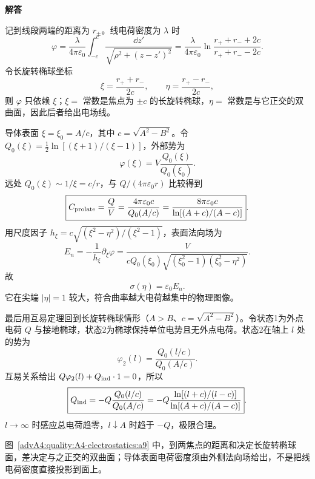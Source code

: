 \begin{advsolution}
\begin{center}\begin{minipage}{.96\linewidth}\centering
\raggedright{\bfseries\color{DeepBlue}解答}\par\smallskip\centering

\label{advA4:quality:A4-electrostatics:a9}
\end{minipage}\end{center}

记到线段两端的距离为 $r_\pm$。线电荷密度为 $\lambda$ 时
\[
 \varphi=\frac\lambda{4\pi\varepsilon_0}
 \int_{-c}^{c}\frac{\dd z'}{\sqrt{\rho^2+(z-z')^2}}
 =\frac\lambda{4\pi\varepsilon_0}
 \ln\frac{r_++r_-+2c}{r_++r_--2c}.
\]
令长旋转椭球坐标
\[
 \xi=\frac{r_++r_-}{2c},\qquad
 \eta=\frac{r_+-r_-}{2c},
\]
则 $\varphi$ 只依赖 $\xi$；$\xi=$ 常数是焦点为 $\pm c$ 的长旋转椭球，$\eta=$ 常数是与它正交的双曲面，因此后者给出电场线。

导体表面 $\xi=\xi_0=A/c$，其中 $c=\sqrt{A^2-B^2}$。令
$Q_0(\xi)=\tfrac12\ln[(\xi+1)/(\xi-1)]$，外部势为
\[
 \varphi(\xi)=V\frac{Q_0(\xi)}{Q_0(\xi_0)}.
\]
远处 $Q_0(\xi)\sim1/\xi=c/r$，与 $Q/(4\pi\varepsilon_0r)$ 比较得到
\[
 \boxed{C_{\rm prolate}=\frac QV
 =\frac{4\pi\varepsilon_0c}{Q_0(A/c)}
 =\frac{8\pi\varepsilon_0c}
 {\ln[(A+c)/(A-c)]}}.
\]
用尺度因子
$h_\xi=c\sqrt{(\xi^2-\eta^2)/(\xi^2-1)}$，表面法向场为
\[
 E_n=-\frac1{h_\xi}\partial_\xi\varphi
 =\frac{V}{cQ_0(\xi_0)
 \sqrt{(\xi_0^2-1)(\xi_0^2-\eta^2)}}.
\]
故
\[
 \boxed{\sigma(\eta)=\varepsilon_0E_n}.
\]
它在尖端 $|\eta|=1$ 较大，符合曲率越大电荷越集中的物理图像。



最后用互易定理回到长旋转椭球情形（$A>B$、$c=\sqrt{A^2-B^2}$）。令状态1为外点电荷 $Q$ 与接地椭球，状态2为椭球保持单位电势且无外点电荷。状态2在轴上 $l$ 处的势为
\[
 \varphi_2(l)=\frac{Q_0(l/c)}{Q_0(A/c)}.
\]
互易关系给出 $Q\varphi_2(l)+Q_{\rm ind}\cdot1=0$，所以
\[
 \boxed{Q_{\rm ind}=-Q\frac{Q_0(l/c)}{Q_0(A/c)}
 =-Q\frac{\ln[(l+c)/(l-c)]}{\ln[(A+c)/(A-c)]}}.
\]
$l\to\infty$ 时感应总电荷趋零，$l\downarrow A$ 时趋于 $-Q$，极限合理。

图~\ref{advA4:quality:A4-electrostatics:a9} 中，到两焦点的距离和决定长旋转椭球面，差决定与之正交的双曲面；导体表面电荷密度须由外侧法向场给出，不是把线电荷密度直接投影到面上。
\end{advsolution}

